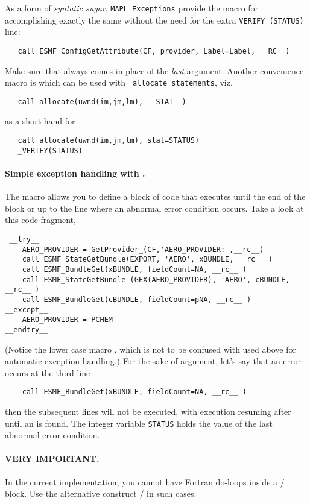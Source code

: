 As a form of {\em syntatic sugar}, {\tt MAPL\_Exceptions} provide the
macro  for accomplishing exactly the same without the need for
the extra {\tt VERIFY\_(STATUS)} line:
\begin{verbatim}
   call ESMF_ConfigGetAttribute(CF, provider, Label=Label, __RC__)
\end{verbatim}
Make sure that  always comes in place of the {\em last} argument.
Another convenience macro is  which can be used with {\tt
  allocate statements}, viz.
\begin{verbatim}
   call allocate(uwnd(im,jm,lm), __STAT__)
\end{verbatim}
as a short-hand for
\begin{verbatim}
   call allocate(uwnd(im,jm,lm), stat=STATUS)
   _VERIFY(STATUS)
\end{verbatim}



\paragraph{Simple exception handling with . }

The  macro allows you to define a block of code that executes
until the end of the block or up to the line where an abnormal error
condition occurs. Take a look at this code fragment,
\begin{verbatim}
 __try__
    AERO_PROVIDER = GetProvider_(CF,'AERO_PROVIDER:',__rc__)
    call ESMF_StateGetBundle(EXPORT, 'AERO', xBUNDLE, __rc__ )
    call ESMF_BundleGet(xBUNDLE, fieldCount=NA, __rc__ )
    call ESMF_StateGetBundle (GEX(AERO_PROVIDER), 'AERO', cBUNDLE, __rc__ )
    call ESMF_BundleGet(cBUNDLE, fieldCount=pNA, __rc__ )
__except__
    AERO_PROVIDER = PCHEM
__endtry__
\end{verbatim}
(Notice the lower case macro , which is not to be confused with
 used above for automatic exception handling.) For the sake of
argument, let's say that an error occurs at the third line
\begin{verbatim}
    call ESMF_BundleGet(xBUNDLE, fieldCount=NA, __rc__ )
\end{verbatim}
then the subsequent lines will not be executed, with execution
resuming after  until an  is found. The integer
variable {\tt STATUS} holds the value of the last abnormal error condition.

\paragraph{VERY IMPORTANT.} In the current implementation, you cannot
have Fortran do-loops inside a / block. Use the
alternative construct / in such cases.

